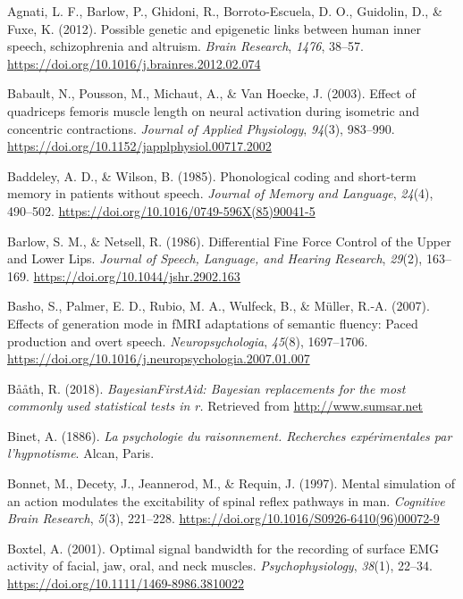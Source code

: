 \documentclass[a4paper,12pt,twoside,openright,oldfontcommands]{memoir}
\begin{document}
\hypertarget{refs}{}
\hypertarget{ref-agnati_possible_2012}{}
Agnati, L. F., Barlow, P., Ghidoni, R., Borroto-Escuela, D. O.,
Guidolin, D., \& Fuxe, K. (2012). Possible genetic and epigenetic links
between human inner speech, schizophrenia and altruism. \emph{Brain
Research}, \emph{1476}, 38--57.
\url{https://doi.org/10.1016/j.brainres.2012.02.074}

\hypertarget{ref-babault_effect_2003}{}
Babault, N., Pousson, M., Michaut, A., \& Van Hoecke, J. (2003). Effect
of quadriceps femoris muscle length on neural activation during
isometric and concentric contractions. \emph{Journal of Applied
Physiology}, \emph{94}(3), 983--990.
\url{https://doi.org/10.1152/japplphysiol.00717.2002}

\hypertarget{ref-baddeley_phonological_1985}{}
Baddeley, A. D., \& Wilson, B. (1985). Phonological coding and
short-term memory in patients without speech. \emph{Journal of Memory
and Language}, \emph{24}(4), 490--502.
\url{https://doi.org/10.1016/0749-596X(85)90041-5}

\hypertarget{ref-barlow_differential_1986}{}
Barlow, S. M., \& Netsell, R. (1986). Differential Fine Force Control of
the Upper and Lower Lips. \emph{Journal of Speech, Language, and Hearing
Research}, \emph{29}(2), 163--169.
\url{https://doi.org/10.1044/jshr.2902.163}

\hypertarget{ref-basho_effects_2007}{}
Basho, S., Palmer, E. D., Rubio, M. A., Wulfeck, B., \& Müller, R.-A.
(2007). Effects of generation mode in fMRI adaptations of semantic
fluency: Paced production and overt speech. \emph{Neuropsychologia},
\emph{45}(8), 1697--1706.
\url{https://doi.org/10.1016/j.neuropsychologia.2007.01.007}

\hypertarget{ref-R-BayesianFirstAid}{}
Bååth, R. (2018). \emph{BayesianFirstAid: Bayesian replacements for the
most commonly used statistical tests in r.} Retrieved from
\url{http://www.sumsar.net}

\hypertarget{ref-binet_psychologie_1886}{}
Binet, A. (1886). \emph{La psychologie du raisonnement. Recherches
expérimentales par l'hypnotisme}. Alcan, Paris.

\hypertarget{ref-bonnet_mental_1997}{}
Bonnet, M., Decety, J., Jeannerod, M., \& Requin, J. (1997). Mental
simulation of an action modulates the excitability of spinal reflex
pathways in man. \emph{Cognitive Brain Research}, \emph{5}(3), 221--228.
\url{https://doi.org/10.1016/S0926-6410(96)00072-9}

\hypertarget{ref-boxtel_optimal_2001}{}
Boxtel, A. (2001). Optimal signal bandwidth for the recording of surface
EMG activity of facial, jaw, oral, and neck muscles.
\emph{Psychophysiology}, \emph{38}(1), 22--34.
\url{https://doi.org/10.1111/1469-8986.3810022}
\end{document}
